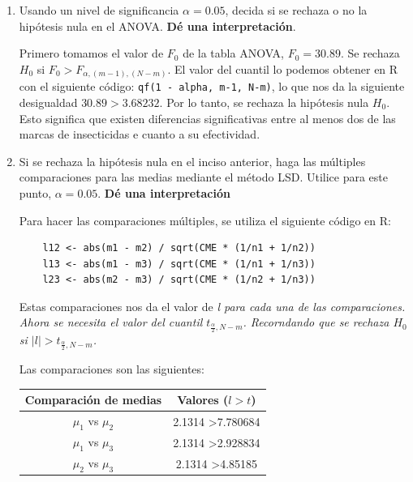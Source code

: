 \documentclass[12pt,a4paper]{article}
\begin{document}
\begin{enumerate}
  Para poder completar la tabla, se utiliza el siguiente código en R:
  \begin{lstlisting}[caption={Código para completar la tabla ANOVA}]
    Tratamientos<-c(rep("Marca1",6),rep("Marca2",6),rep("Marca3",6))
    Insecticidas<-c(Marca1,Marca2,Marca3)

    Datos<-data.frame(TRATAMIENTOS=Tratamientos,INSECTICIDA=Insecticidas)
    Anova1<-aov(Datos$INS~Datos$TRAT)

    summary(Anova1)
  \end{lstlisting}

  \item Usando un nivel de significancia \(\alpha=0.05\), decida si se rechaza o no la hipótesis nula en el ANOVA. \textbf{Dé una interpretación}. 
  
  Primero tomamos el valor de \(F_0\) de la tabla ANOVA, \( F_0 =  30.89 \). Se rechaza \( H_0 \) si \( F_0 > F_{\alpha,(m-1),(N-m)} \). El valor del cuantil lo podemos obtener en R con el siguiente código: \texttt{qf(1 - alpha, m-1, N-m)}, lo que nos da la siguiente desigualdad \( 30.89 > 3.68232 \). Por lo tanto, se rechaza la hipótesis nula \( H_0 \). Esto significa que existen diferencias significativas entre al menos dos de las marcas de insecticidas e cuanto a su efectividad.

  \item Si se rechaza la hipótesis nula en el inciso anterior, haga las múltiples comparaciones para las medias mediante el método LSD. Utilice para este punto, \(\alpha=0.05\). \textbf{Dé una interpretación}
  
  Para hacer las comparaciones múltiples, se utiliza el siguiente código en R:
  \begin{lstlisting}
    l12 <- abs(m1 - m2) / sqrt(CME * (1/n1 + 1/n2))
    l13 <- abs(m1 - m3) / sqrt(CME * (1/n1 + 1/n3))
    l23 <- abs(m2 - m3) / sqrt(CME * (1/n2 + 1/n3))
  \end{lstlisting}
  Estas comparaciones nos da el valor de \it{l} para cada una de las comparaciones. Ahora se necesita el valor del cuantil \( t_{\frac{\alpha}{2},N-m} \). Recorndando que se rechaza \(H_0\) si \(|l| > t_{\frac{\alpha}{2},N-m}\).

  Las comparaciones son las siguientes:
  \begin{table}[H]
    \centering
    \begin{tabular}{@{}cc@{}}
    \toprule
    Comparación de medias & Valores ($l > t$)            \\ \midrule
    $\mu_1$ vs $\mu_2$    & 2.1314 \textgreater 7.780684 \\
    $\mu_1$ vs $\mu_3$    & 2.1314 \textgreater 2.928834 \\
    $\mu_2$ vs $\mu_3$    & 2.1314 \textgreater 4.85185  \\ \bottomrule
    \end{tabular}
  \end{table}


\end{enumerate}
\end{document}
